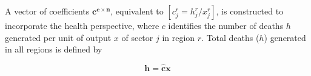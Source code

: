 \documentclass[a4paper,12pt]{article}
\begin{document}
A vector of coefficients $\mathbf{c^{e \times n}}$, equivalent to $[c^r_{j}=h^r_j/x^r_j]$, is constructed to incorporate the health perspective, where $c$ identifies the number of deaths $h$ 
generated per unit of output $x$ of sector $j$ in region $r$. Total deaths ($h$) generated in all regions is defined by

\begin{equation} 
\mathbf{h = \hat{c}x} 
\label{08}
\end{equation}
\end{document}
